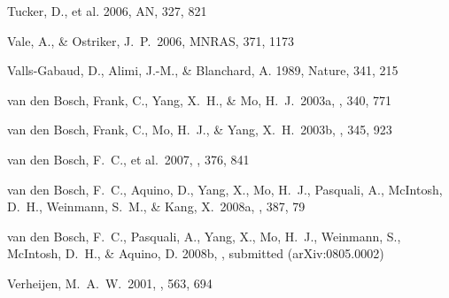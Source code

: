 \documentclass[]{emulateapj}
\begin{document}
\begin{thebibliography}{999}
Tucker, D., et al. 2006, AN, 327, 821


Vale, A., \& Ostriker, J.~P.\ 2006, MNRAS, 371, 1173

Valls-Gabaud, D., Alimi, J.-M., \& Blanchard, A. 1989, Nature,
341, 215 

van den Bosch, Frank, C., Yang, X.\ H., \& Mo, H.\ J.\ 2003a, \mnras, 340, 771

van den Bosch, Frank, C., Mo, H.\ J., \& Yang, X.\ H.\ 2003b, \mnras, 345, 923

van den Bosch, F.~C., et al.\ 2007, \mnras, 376, 841 

van den Bosch, F.~C., Aquino, D., Yang, X., Mo, H.~J., Pasquali, A., 
McIntosh, D.~H., Weinmann, S.~M., \& Kang, X.\ 2008a, \mnras, 387, 79 

van den Bosch, F.\ C., Pasquali, A., Yang, X., Mo, H.\ J., Weinmann, S., 
McIntosh, D.\ H., \& Aquino, D. 2008b, \mnras, submitted (arXiv:0805.0002)



Verheijen, M.~A.~W.\ 2001, \apj, 563, 694


\end{thebibliography}
\end{document}
